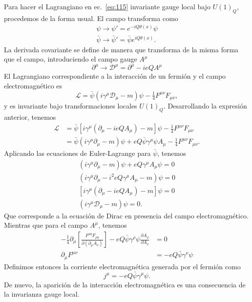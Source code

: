 Para hacer el Lagrangiano en ec.~\eqref{eq:115} invariante gauge local bajo $U(1)_Q$, procedemos de la forma usual. El campo transforma como
\begin{align}
  \psi\to\psi'=e^{-iQ\theta(x)}\psi\nonumber\\
  \bar{\psi}\to\bar{\psi}'=\bar{\psi}e^{iQ\theta(x)}.
\end{align}
La derivada covariante se define de manera que transforma de la misma forma que el campo, introduciendo el campo gauge $A^\mu$
\begin{equation}
  \label{eq:202}
  \partial^\mu\to\mathcal{D}^\mu=\partial^\mu-ieQA^\mu
\end{equation}
El Lagrangiano correspondiente a la interacci\'on de un fermi\'on y el campo electromagn\'etico es
\begin{equation}
  \label{eq:201}
  \mathcal{L}=\bar{\psi}\left(i\gamma^\mu\mathcal{D}_\mu-m\right)\psi -\tfrac{1}{4}F^{\mu\nu}F_{\mu\nu},
\end{equation}
y es invariante bajo transformaciones locales $U(1)_Q$. Desarrollando la expresi\'on anterior, tenemos
\begin{align}
    \mathcal{L}&=\bar{\psi}\left[i\gamma^\mu\left(\partial_\mu-ieQA_\mu\right)-m\right]\psi -\tfrac{1}{4}F^{\mu\nu}F_{\mu\nu}\nonumber\\
    &=\bar{\psi}\left(i\gamma^\mu\partial_\mu-m\right)\psi+eQ\bar{\psi}\gamma^\mu\psi A_\mu -\tfrac{1}{4}F^{\mu\nu}F_{\mu\nu}.
\end{align}
Aplicando las ecuaciones de Euler-Lagrange para $\bar{\psi}$, tenemos
\begin{align}
  (i\gamma^\mu\partial_\mu-m)\psi+eQ\gamma^\mu A_\mu\psi=0\nonumber\\
  (i\gamma^\mu\partial_\mu-i^2eQ\gamma^\mu A_\mu-m)\psi=0\nonumber\\
  [i\gamma^\mu(\partial_\mu-ieQA_\mu)-m]\psi=0\nonumber\\
  (i\gamma^\mu\mathcal{D}_\mu-m)\psi=0.
\end{align}
Que corresponde a la ecuaci\'on de Dirac en presencia del campo electromagn\'etico. Mientras que para el campo $A^\mu$, tenemos
\begin{align}
  -\frac{1}{4}\partial_\mu\left[\frac{F^{\rho\eta}F_{\rho\eta}}{\partial\left(\partial_\mu A_\nu\right)}\right]-eQ\bar{\psi}\gamma^\rho\psi\frac{\partial A_\rho}{\partial A_\nu}&=0\nonumber\\
  \partial_\mu F^{\mu\nu}&=-eQ\bar{\psi}\gamma^\nu\psi
\end{align}
Definimos entonces la corriente electromagn\'etica generada por el fermi\'on como
\begin{equation}
  \label{eq:222}
  j^\mu=-eQ\bar{\psi}\gamma^\mu\psi.
\end{equation}
De nuevo, la aparici\'on de la interacci\'on electromagn\'etica es una consecuencia de la invarianza gauge local. 

